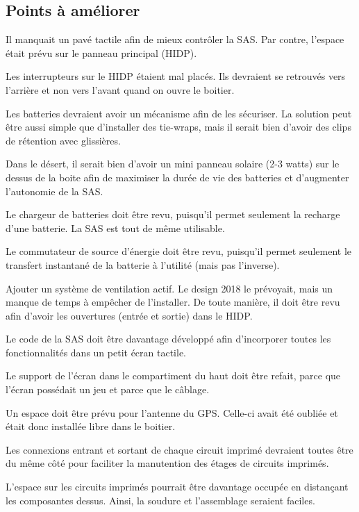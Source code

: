\subsection{Points à améliorer}

Il manquait un pavé tactile afin de mieux contrôler la SAS. Par contre,
l’espace était prévu sur le panneau principal (HIDP).
\par
Les interrupteurs sur le HIDP étaient mal placés. Ils devraient se retrouvés
vers l’arrière et non vers l’avant quand on ouvre le boitier.
\par
Les batteries devraient avoir un mécanisme afin de les sécuriser. La solution
peut être aussi simple que d’installer des tie-wraps, mais il serait bien
d’avoir des clips de rétention avec glissières.
\par
Dans le désert, il serait bien d’avoir un mini panneau solaire (2-3 watts) sur
le dessus de la boite afin de maximiser la durée de vie des batteries et
d’augmenter l’autonomie de la SAS.
\par
Le chargeur de batteries doit être revu, puisqu’il permet seulement la recharge
d’une batterie. La SAS est tout de même utilisable.
\par
Le commutateur de source d’énergie doit être revu, puisqu’il permet seulement
le transfert instantané de la batterie à l’utilité (mais pas l’inverse).
\par
Ajouter un système de ventilation actif. Le design 2018 le prévoyait, mais un
manque de temps à empêcher de l’installer. De toute manière, il doit être revu
afin d’avoir les ouvertures (entrée et sortie) dans le HIDP.
\par
Le code de la SAS doit être davantage développé afin d’incorporer toutes les
fonctionnalités dans un petit écran tactile.
\par
Le support de l’écran dans le compartiment du haut doit être refait, parce que
l’écran possédait un jeu et parce que le câblage.
\par
Un espace doit être prévu pour l’antenne du GPS. Celle-ci avait été oubliée et
était donc installée libre dans le boitier.
\par
Les connexions entrant et sortant de chaque circuit imprimé devraient toutes
être du même côté pour faciliter la manutention des étages de circuits imprimés.
\par
L’espace sur les circuits imprimés pourrait être davantage occupée en
distançant les composantes dessus. Ainsi, la soudure et l’assemblage seraient
faciles.
